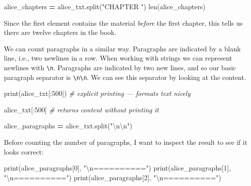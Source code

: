\documentclass[]{book}
\newenvironment{Shaded}{\begin{snugshade}}{\end{snugshade}}
\newcommand{\BuiltInTok}[1]{#1}
\newcommand{\CharTok}[1]{\textcolor[rgb]{0.31,0.60,0.02}{#1}}
\newcommand{\CommentTok}[1]{\textcolor[rgb]{0.56,0.35,0.01}{\textit{#1}}}
\newcommand{\DecValTok}[1]{\textcolor[rgb]{0.00,0.00,0.81}{#1}}
\newcommand{\NormalTok}[1]{#1}
\newcommand{\OperatorTok}[1]{\textcolor[rgb]{0.81,0.36,0.00}{\textbf{#1}}}
\newcommand{\StringTok}[1]{\textcolor[rgb]{0.31,0.60,0.02}{#1}}
\begin{document}
\begin{Shaded}
\begin{Highlighting}[]
\NormalTok{alice_chapters }\OperatorTok{=}\NormalTok{ alice_txt.split(}\StringTok{"CHAPTER "}\NormalTok{)}
\BuiltInTok{len}\NormalTok{(alice_chapters)}
\end{Highlighting}
\end{Shaded}

Since the first element contains the material \emph{before} the first chapter, this tells us there are twelve chapters in the book.

We can count paragraphs in a similar way. Paragraphs are indicated by a blank line, i.e., two newlines in a row. When working with strings we can represent newlines with \texttt{\textbackslash{}n}. Paragraphs are indicated by two new lines, and so our basic paragraph separator is \texttt{\textbackslash{}n\textbackslash{}n}. We can see this separator by looking at the content.

\begin{Shaded}
\begin{Highlighting}[]
\BuiltInTok{print}\NormalTok{(alice_txt[:}\DecValTok{500}\NormalTok{]) }\CommentTok{# explicit printing --- formats text nicely}

\NormalTok{alice_txt[:}\DecValTok{500}\NormalTok{] }\CommentTok{# returns content without printing it}
\end{Highlighting}
\end{Shaded}

\begin{Shaded}
\begin{Highlighting}[]
\NormalTok{alice_paragraphs }\OperatorTok{=}\NormalTok{ alice_txt.split(}\StringTok{"}\CharTok{\textbackslash{}n\textbackslash{}n}\StringTok{"}\NormalTok{)}
\end{Highlighting}
\end{Shaded}

Before counting the number of paragraphs, I want to inspect the result to see if it looks correct:

\begin{Shaded}
\begin{Highlighting}[]
\BuiltInTok{print}\NormalTok{(alice_paragraphs[}\DecValTok{0}\NormalTok{], }\StringTok{"}\CharTok{\textbackslash{}n}\StringTok{=========="}\NormalTok{)}
\BuiltInTok{print}\NormalTok{(alice_paragraphs[}\DecValTok{1}\NormalTok{], }\StringTok{"}\CharTok{\textbackslash{}n}\StringTok{=========="}\NormalTok{)}
\BuiltInTok{print}\NormalTok{(alice_paragraphs[}\DecValTok{2}\NormalTok{], }\StringTok{"}\CharTok{\textbackslash{}n}\StringTok{=========="}\NormalTok{)}
\end{Highlighting}
\end{Shaded}
\end{document}
